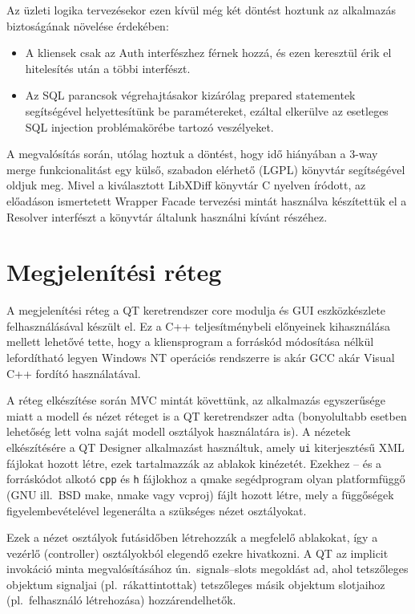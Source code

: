 \documentclass[a4paper,12pt]{article}
\begin{document}
Az üzleti logika tervezésekor ezen kívül még két döntést hoztunk az alkalmazás
biztoságának növelése érdekében:

\begin{itemize}
\item A kliensek csak az Auth interfészhez férnek hozzá, és ezen keresztül érik
el hitelesítés után a többi interfészt.
\item Az SQL parancsok végrehajtásakor kizárólag prepared statementek
segítségével helyettesítünk be paramétereket, ezáltal elkerülve az esetleges
SQL injection problémakörébe tartozó veszélyeket.
\end{itemize}

A megvalósítás során, utólag hoztuk a döntést, hogy idő hiányában a 3-way merge
funkcionalitást egy külső, szabadon elérhető (LGPL) könyvtár segítségével
oldjuk meg. Mivel a kiválasztott LibXDiff könyvtár C nyelven íródott, az
előadáson ismertetett Wrapper Facade tervezési mintát használva készítettük el
a Resolver interfészt a könyvtár általunk használni kívánt részéhez.

\section{Megjelenítési réteg}

A megjelenítési réteg a QT keretrendszer core modulja és GUI eszközkészlete
felhasználásával készült el. Ez a C++ teljesítménybeli előnyeinek kihasználása
mellett lehetővé tette, hogy a kliensprogram a forráskód módosítása nélkül
lefordítható legyen Windows NT operációs rendszerre is akár GCC akár Visual
C++ fordító használatával.

A réteg elkészítése során MVC mintát követtünk, az alkalmazás egyszerűsége miatt
a modell és nézet réteget is a QT keretrendszer adta (bonyolultabb esetben
lehetőség lett volna saját modell osztályok használatára is). A nézetek
elkészítésére a QT Designer alkalmazást használtuk, amely \verb|ui| kiterjesztésű
XML fájlokat hozott létre, ezek tartalmazzák az ablakok kinézetét. Ezekhez --
és a forráskódot alkotó \verb|cpp| és \verb|h| fájlokhoz a qmake segédprogram
olyan platformfüggő (GNU ill.\ BSD make, nmake vagy vcproj) fájlt hozott létre,
mely a függőségek figyelembevételével legenerálta a szükséges nézet osztályokat.

Ezek a nézet osztályok futásidőben létrehozzák a megfelelő ablakokat, így a
vezérlő (controller) osztályokból elegendő ezekre hivatkozni. A QT az implicit
invokáció minta megvalósításához ún.\ signals--slots megoldást ad, ahol tetszőleges
objektum signaljai (pl.\ rákattintottak) tetszőleges másik objektum slotjaihoz
(pl.\ felhasználó létrehozása) hozzárendelhetők.
\end{document}
